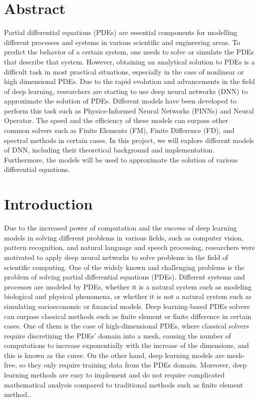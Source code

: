 \documentclass[a4paper,12pt]{article}
\theoremstyle{definition}
\begin{document}

\onehalfspacing %
\section*{Abstract}
Partial differential equations (PDEs) are essential components for modelling different processes 
and systems in various scientific and engineering areas. To predict the behavior of a certain system, 
one needs to solve or simulate the PDEs that describe that system. However, 
obtaining an analytical solution to PDEs is a difficult task in most practical situations, 
especially in the case of nonlinear or high dimensional PDEs. 
Due to the rapid evolution and advancements in the field of deep learning, 
researchers are starting to use deep neural networks (DNN) to approximate the solution of PDEs. 
Different models have been developed to perform this task such as Physics-Informed Neural Networks (PINNs) 
and Neural Operator. The speed and the efficiency of these models can surpass other common solvers 
such as Finite Elements (FM), Finite Difference (FD), and spectral methods in certain cases. 
In this project, we will explore different models of DNN, including their theoretical background and implementation.
Furthermore, the models will be used to approximate the solution of various differential equations.

\section{Introduction}
Due to the increased power of computation and the success of deep learning models in 
solving different problems in various fields, such
as computer vision\cite{chai2021deep}, pattern recognition\cite{serey2023pattern}, 
and natural language and speech processing\cite{NLPChai}, 
researchers were motivated to apply deep neural networks to solve problems in the field of scientific computing. 
One of the widely known and challenging problems is the problem of solving partial differential equations (PDEs).
Different systems and processes are modeled by PDEs, whether it is a natural system such as 
modeling biological and physical phenomena\cite{grossmann2023can,beck2020overview}, or whether it is not a natural system such as
simulating socioeconomic or financial models\cite{beck2020overview}. Deep learning-based PDEs solvers can surpass classical methods such as 
finite element or finite difference in certain cases\cite{grossmann2023can}. 
One of them is the case of high-dimensional PDEs, where classical solvers require discretizing the PDEs’ domain into a mesh, 
causing the number of computations to increase exponentially with the increase of the dimensions, and this is known as the curse.
On the other hand, deep learning models are mesh-free, so they only require training data from the PDEs domain. 
Moreover, deep learning methods are easy to implement and do not require complicated mathematical 
analysis compared to traditional methods such as finite element method.\cite{grossmann2023can}. 
\end{document}
